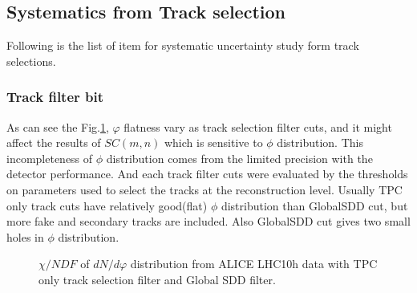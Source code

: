 \subsection{Systematics from Track selection}
	Following is the list of item for systematic uncertainty study form track selections.
	
\subsubsection{Track filter bit}
	As can see the Fig.\ref{fig:dndphi}, $\varphi$ flatness vary as track selection filter cuts, and it might affect the results of $SC(m,n)$ which is sensitive to $\phi$ distribution. This incompleteness of $\phi$ distribution comes from the limited precision with the detector performance. And each track filter cuts were evaluated by the thresholds on parameters used to select the tracks at the reconstruction level. Usually TPC only track cuts have relatively good(flat) $\phi$ distribution than GlobalSDD cut, but more fake and secondary tracks are included. Also GlobalSDD cut gives two small holes in $\phi$ distribution. 
			
 	\begin{figure}[h]
		\begin{center}
        \caption{$\chi/NDF$ of $dN/d\varphi$ distribution from ALICE LHC10h data with TPC only track selection filter and Global SDD filter.}
        \label{fig:dndphi}
        \end{center}   
     \end{figure}
	
